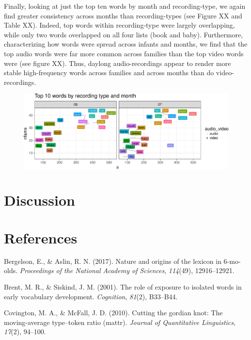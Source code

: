 \documentclass[man]{apa6}
\theoremstyle{definition}
\theoremstyle{definition}
\theoremstyle{definition}
\theoremstyle{remark}
\begin{document}
Finally, looking at just the top ten words by month and recording-type,
we again find greater consistency across months than recording-types
(see Figure XX and Table XX). Indeed, top words within recording-type
were largely overlapping, while only two words overlapped on all four
lists (book and baby). Furthermore, characterizing how words were spread
across infants and months, we find that the top audio words were far
more common across families than the top video words were (see figure
XX). Thus, daylong audio-recordings appear to render more stable
high-frequency words across families and across months than do
video-recordings.

\begin{figure}[htbp]
\centering
\includegraphics{sixseven_papaja_files/figure-latex/top10noun_freq-1.pdf}
\caption{}
\end{figure}

\section{Discussion}\label{discussion}

\newpage

\section{References}\label{references}

\setlength{\parindent}{-0.5in} \setlength{\leftskip}{0.5in}

\hypertarget{refs}{}
\hypertarget{ref-bergelson2017nature}{}
Bergelson, E., \& Aslin, R. N. (2017). Nature and origins of the lexicon
in 6-mo-olds. \emph{Proceedings of the National Academy of Sciences},
\emph{114}(49), 12916--12921.

\hypertarget{ref-brent2001role}{}
Brent, M. R., \& Siskind, J. M. (2001). The role of exposure to isolated
words in early vocabulary development. \emph{Cognition}, \emph{81}(2),
B33--B44.

\hypertarget{ref-covington2010cutting}{}
Covington, M. A., \& McFall, J. D. (2010). Cutting the gordian knot: The
moving-average type--token ratio (mattr). \emph{Journal of Quantitative
Linguistics}, \emph{17}(2), 94--100.
\end{document}
